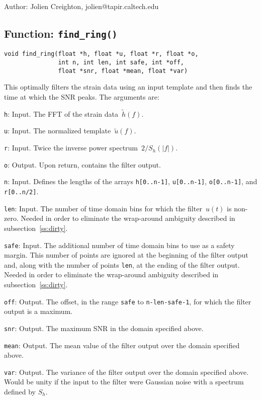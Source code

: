 \begin{description}
\item{Author:}  Jolien Creighton, jolien@tapir.caltech.edu
\end{description}


\clearpage
\subsection{Function: \texttt{find\_ring()}}

\begin{verbatim}
void find_ring(float *h, float *u, float *r, float *o,
               int n, int len, int safe, int *off,
               float *snr, float *mean, float *var)
\end{verbatim}
This optimally filters the strain data using an input template
and then finds the time at which the SNR peaks.  The arguments are:
\begin{description}
\item{\texttt{h}}: Input.  The FFT of the strain data~$\tilde{h}(f)$.
\item{\texttt{u}}: Input.  The normalized template~$\tilde{u}(f)$.
\item{\texttt{r}}: Input.  Twice the inverse power spectrum~$2/S_h(|f|)$.
\item{\texttt{o}}: Output.  Upon return, contains the filter output.
\item{\texttt{n}}: Input.  Defines the lengths of the arrays
  \texttt{h[0..n-1]}, \texttt{u[0..n-1]}, \texttt{o[0..n-1]},
  and \texttt{r[0..n/2]}.
\item{\texttt{len}}: Input.  The number of time domain bins for which
  the filter~$u(t)$ is non-zero.  Needed in order to eliminate the wrap-around
  ambiguity described in subsection~\ref{ss:dirty}.
\item{\texttt{safe}}: Input.  The additional number of time domain bins to use
  as a safety margin.  This number of points are ignored at the beginning of
  the filter output and, along with the number of points \texttt{len}, at the
  ending of the filter output.  Needed in order to eliminate the wrap-around
  ambiguity described in subsection~\ref{ss:dirty}.
\item{\texttt{off}}: Output.  The offset, in the range \texttt{safe} to
  \texttt{n-len-safe-1}, for which the filter output is a maximum.
\item{\texttt{snr}}: Output.  The maximum SNR in the domain specified above.
\item{\texttt{mean}}: Output.  The mean value of the filter output over the
  domain specified above.
\item{\texttt{var}}: Output.  The variance of the filter output over the
  domain specified above.  Would be unity if the input to the filter were
  Gaussian noise with a spectrum defined by $S_h$.
\end{description}

